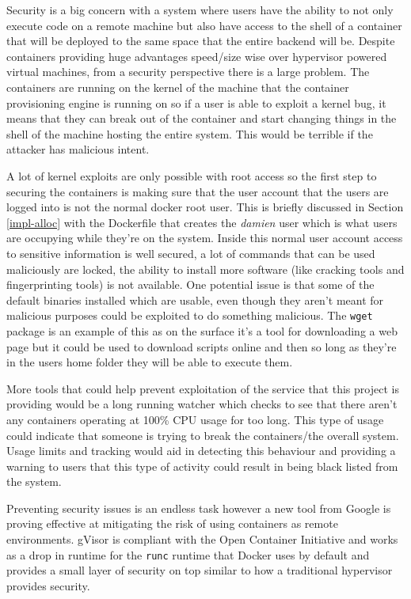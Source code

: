
Security is a big concern with a system where users have the ability to not only execute code on a remote machine but also have access to the shell of a container that will be deployed to the same space that the entire backend will be. Despite containers providing huge advantages speed/size wise over hypervisor powered virtual machines, from a security perspective there is a large problem. The containers are running on the kernel of the machine that the container provisioning engine is running on so if a user is able to exploit a kernel bug, it means that they can break out of the container and start changing things in the shell of the machine hosting the entire system. This would be terrible if the attacker has malicious intent.

A lot of kernel exploits are only possible with root access so the first step to securing the containers is making sure that the user account that the users are logged into is not the normal docker root user. This is briefly discussed in Section \ref{impl-alloc} with the Dockerfile that creates the \textit{damien} user which is what users are occupying while they're on the system. Inside this normal user account access to sensitive information is well secured, a lot of commands that can be used maliciously are locked, the ability to install more software (like cracking tools and fingerprinting tools) is not available. One potential issue is that some of the default binaries installed which are usable, even though they aren't meant for malicious purposes could be exploited to do something malicious. The \texttt{wget} package is an example of this as on the surface it's a tool for downloading a web page but it could be used to download scripts online and then so long as they're in the users home folder they will be able to execute them. 

More tools that could help prevent exploitation of the service that this project is providing would be a long running watcher which checks to see that there aren't any containers operating at 100\% CPU usage for too long. This type of usage could indicate that someone is trying to break the containers/the overall system. Usage limits and tracking would aid in detecting this behaviour and providing a warning to users that this type of activity could result in being black listed from the system.

Preventing security issues is an endless task however a new tool from Google is proving effective at mitigating the risk of using containers as remote environments. gVisor \cite{gvisor} is compliant with the Open Container Initiative and works as a drop in runtime for the \texttt{runc} runtime that Docker uses by default and provides a small layer of security on top similar to how a traditional hypervisor provides security.

